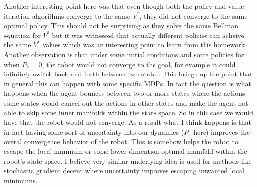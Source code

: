 \documentclass{article}
\begin{document}
	Another interesting point here was that even though both the policy and value iteration algorithms converge to the same $V^*$, they did not converge to the same optimal policy. This should not be surprising as they solve the same Bellman equation for $V^*$ but it was witnessed that actually different policies can acheive the same $V^*$ values which was an interesting point to learn from this homework.\\ 
	
	Another observation is that under some initial conditions and some policies for when $P_{e} = 0$, the robot would not converge to the goal, for example it could infinitely switch back and forth between two states. This brings up the point that in general this can happen with some specific MDPs. In fact the question is what happens when the agent bounces between two or more states where the actions some states would cancel out the actions in other states and make the agent not able to skip some inner manifolds within the state space. So in this case we would have that the robot would not converge. As a result what I think happens is that in fact having some sort of uncertainty into our dynamics ($P_{e}$ here) improves the overal convergence behavior of the robot. This is somehow helps the robot to escape the local minimum or some lower dimention optimal manifold within the robot's state space. I believe very similar underlying idea is used for methods like stochastic gradient decent where uncertainty improves escaping unwanted local minimums. 
\end{document}
